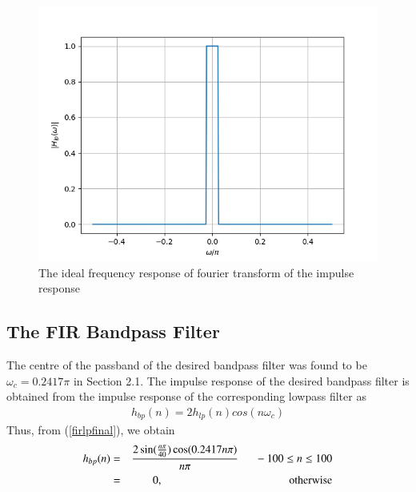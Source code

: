 \documentclass{article}
\begin{document}
\begin{figure}[H]
\includegraphics[width = \columnwidth]{figs/ideal.png}
\caption{The ideal frequency response of fourier transform of the impulse response}
\label{fig8}
\end{figure}

\subsection{The FIR Bandpass Filter}
The centre of the passband of the desired bandpass filter was found to be $\omega_c = 0.2417\pi$ in Section
2.1.  The impulse response of the desired bandpass filter is obtained from the impulse response of the
corresponding lowpass filter as
\begin{eqnarray}
h_{bp}(n) = 2h_{lp}(n)cos(n\omega_c)
\end{eqnarray}
Thus, from (\ref{firlpfinal}), we obtain
\begin{eqnarray}
\label{firbpfinal}
h_{bp}(n) &=& \frac{2\sin(\frac{n\pi}{40}) \cos(0.2417n\pi)}{n\pi} \indent -100 \leq n \leq 100 \nonumber \\
&=& 0, \hspace{4cm} \mbox{otherwise}
\end{eqnarray}
\end{document}
